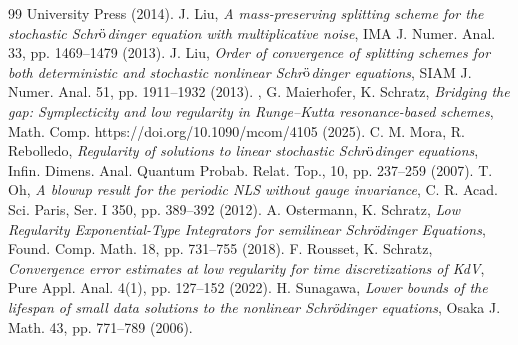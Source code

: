 \documentclass[a4paper]{amsart}
\begin{document}
\begin{thebibliography}{99}
University Press (2014).
 J. Liu, {\em A mass-preserving splitting scheme for the stochastic Schr$\ddot{\rm o}$dinger equation with multiplicative noise}, IMA J. Numer. Anal. 33, pp. 1469--1479 (2013).
  J. Liu, {\em Order of convergence of splitting schemes for both deterministic and stochastic nonlinear
Schr$\ddot{\rm o}$dinger equations}, SIAM J. Numer. Anal. 51, pp. 1911--1932 (2013).
, G. Maierhofer, K. Schratz, {\em Bridging the gap: Symplecticity and low regularity in Runge--Kutta resonance-based schemes}, Math. Comp. https://doi.org/10.1090/mcom/4105 (2025).
C. M. Mora, R. Rebolledo, {\em Regularity of solutions to linear stochastic Schr$\ddot{\rm o}$dinger equations}, Infin. Dimens. Anal. Quantum Probab. Relat. Top., 10, pp. 237–259 (2007).
T. Oh, {\em A blowup result for the periodic NLS without gauge invariance}, C. R. Acad. Sci.
Paris, Ser. I 350, pp. 389--392 (2012).
 A. Ostermann, K. Schratz, {\em Low Regularity Exponential-Type Integrators for semilinear Schrödinger
Equations}, Found. Comp. Math. 18, pp. 731–755 (2018).
 F. Rousset, K. Schratz, {\em Convergence error estimates at low regularity for time discretizations of KdV}, Pure Appl. Anal. 4(1), pp. 127--152 (2022).
H. Sunagawa, {\em Lower bounds of the lifespan of small data solutions to the nonlinear
Schrödinger equations}, Osaka J. Math. 43, pp. 771--789 (2006).
\end{thebibliography}
\end{document}
